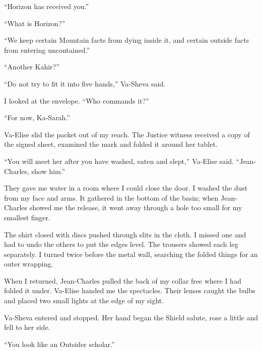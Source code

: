``Horizon has received you.''\par

``What is Horizon?''\par

``We keep certain Mountain facts from dying inside it, and certain outside facts from entering uncontained.''\par

``Another Kahir?''\par

``Do not try to fit it into five hands,'' Va-Sheva said.\par

I looked at the envelope. ``Who commands it?''\par

``For now, Ka-Sarah.''\par

Va-Elise slid the packet out of my reach. The Justice witness received a copy of the signed sheet, examined the mark and folded it around her tablet.\par

``You will meet her after you have washed, eaten and slept,'' Va-Elise said. ``Jean-Charles, show him.''\par

\ornament

They gave me water in a room where I could close the door. I washed the dust from my face and arms. It gathered in the bottom of the basin; when Jean-Charles showed me the release, it went away through a hole too small for my smallest finger.\par

The shirt closed with discs pushed through slits in the cloth. I missed one and had to undo the others to put the edges level. The trousers showed each leg separately. I turned twice before the metal wall, searching the folded things for an outer wrapping.\par

When I returned, Jean-Charles pulled the back of my collar free where I had folded it under. Va-Elise handed me the spectacles. Their lenses caught the bulbs and placed two small lights at the edge of my sight.\par

Va-Sheva entered and stopped. Her hand began the Shield salute, rose a little and fell to her side.\par

``You look like an Outsider scholar.''\par


